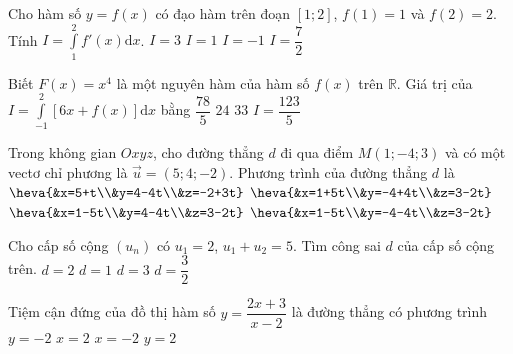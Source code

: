 \begin{ex}%
	Cho hàm số $y=f(x)$  có  đạo hàm trên đoạn $[1;2]$, $f(1)=1$ và $f(2)=2$. Tính \break $I=\displaystyle \int \limits_1^2 f'(x)\mathrm{d}x$.
\choice
{ $I=3$}
{\True $I=1$}
{$I=-1$}
{$I=\dfrac{7}{2}$}
\end{ex}

\begin{ex}%
Biết  $F(x)=x^4$ là một nguyên hàm của hàm số  $f(x)$ trên  $\mathbb{R}$. Giá trị của    $I=\displaystyle \int \limits_{-1}^2 [6x+f(x)]\mathrm{d}x$ bằng
\choice
{ $\dfrac{78}{5}$}
{\True $24$}
{$33$}
{$I=\dfrac{123}{5}$}
\end{ex}

\begin{ex}%
Trong không gian  $Oxyz$, cho đường thẳng  $d$  đi qua điểm  $M(1;-4;3)$  và có một vectơ chỉ phương là  $\vec{u}=(5;4;-2)$. Phương trình của  đường thẳng  $d$ là
\choice
{ $\heva{&x=5+t\\&y=4-4t\\&z=-2+3t}$}
{\True $\heva{&x=1+5t\\&y=-4+4t\\&z=3-2t}$}
{$\heva{&x=1-5t\\&y=4-4t\\&z=3-2t}$}
{$\heva{&x=1-5t\\&y=-4-4t\\&z=3-2t}$}
\end{ex}

\begin{ex}%
Cho cấp số cộng $(u_n)$ có $u_1=2$, $u_1+u_2=5$. Tìm công sai $d$ của cấp số cộng trên.
\choice
{ $d=2$}
{\True $d=1$}
{$d=3$}
{$d=\dfrac{3}{2}$}
\end{ex}

\begin{ex}%
Tiệm cận đứng của đồ thị hàm số  $y=\dfrac{2x+3}{x-2}$  là đường thẳng có phương trình
\choice
{ $y=-2$}
{\True $x=2$}
{$x=-2$}
{$y=2$}
\end{ex}

